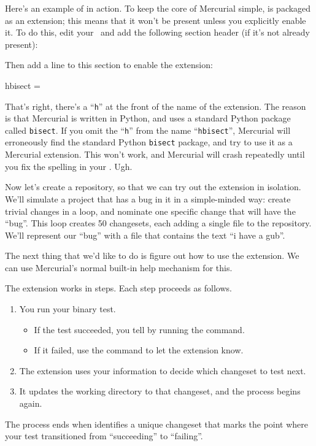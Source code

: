Here's an example of  in action.  To keep the core of
Mercurial simple,  is packaged as an extension; this
means that it won't be present unless you explicitly enable it.  To do
this, edit your \hgrc\ and add the following section header (if it's
not already present):
\begin{codesample2}
  [extensions]
\end{codesample2}
Then add a line to this section to enable the extension:
\begin{codesample2}
  hbisect =
\end{codesample2}
\begin{note}
  That's right, there's a ``\texttt{h}'' at the front of the name of
  the  extension.  The reason is that Mercurial is
  written in Python, and uses a standard Python package called
  \texttt{bisect}.  If you omit the ``\texttt{h}'' from the name
  ``\texttt{hbisect}'', Mercurial will erroneously find the standard
  Python \texttt{bisect} package, and try to use it as a Mercurial
  extension.  This won't work, and Mercurial will crash repeatedly
  until you fix the spelling in your \hgrc.  Ugh.
\end{note}

Now let's create a repository, so that we can try out the
 extension in isolation.
We'll simulate a project that has a bug in it in a simple-minded way:
create trivial changes in a loop, and nominate one specific change
that will have the ``bug''.  This loop creates 50 changesets, each
adding a single file to the repository.  We'll represent our ``bug''
with a file that contains the text ``i have a gub''.

The next thing that we'd like to do is figure out how to use the
 extension.  We can use Mercurial's normal built-in help
mechanism for this.

The  extension works in steps.  Each step proceeds as follows.
\begin{enumerate}
\item You run your binary test.
  \begin{itemize}
  \item If the test succeeded, you tell  by running the
     command.
  \item If it failed, use the  command to let
    the  extension know.
  \end{itemize}
\item The extension uses your information to decide which changeset to
  test next.
\item It updates the working directory to that changeset, and the
  process begins again.
\end{enumerate}
The process ends when  identifies a unique changeset
that marks the point where your test transitioned from ``succeeding''
to ``failing''.

